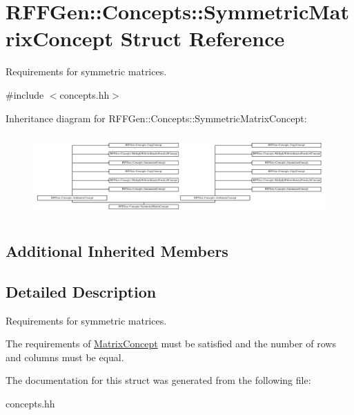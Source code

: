 \hypertarget{structRFFGen_1_1Concepts_1_1SymmetricMatrixConcept}{\section{R\-F\-F\-Gen\-:\-:Concepts\-:\-:Symmetric\-Matrix\-Concept Struct Reference}
\label{structRFFGen_1_1Concepts_1_1SymmetricMatrixConcept}
}


Requirements for symmetric matrices.  




{\ttfamily \#include $<$concepts.\-hh$>$}

Inheritance diagram for R\-F\-F\-Gen\-:\-:Concepts\-:\-:Symmetric\-Matrix\-Concept\-:\begin{figure}[H]
\begin{center}
\leavevmode
\includegraphics[height=3.172805cm]{structRFFGen_1_1Concepts_1_1SymmetricMatrixConcept}
\end{center}
\end{figure}
\subsection*{Additional Inherited Members}


\subsection{Detailed Description}
Requirements for symmetric matrices. 

The requirements of \hyperlink{structRFFGen_1_1Concepts_1_1MatrixConcept}{Matrix\-Concept} must be satisfied and the number of rows and columns must be equal. 

The documentation for this struct was generated from the following file\-:\begin{DoxyCompactItemize}
\item 
concepts.\-hh\end{DoxyCompactItemize}

